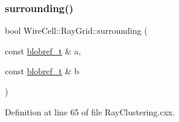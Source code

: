 \subsubsection{\texorpdfstring{surrounding()}{surrounding()}}
{\footnotesize\ttfamily bool Wire\+Cell\+::\+Ray\+Grid\+::surrounding (\begin{DoxyParamCaption}\item[{const \hyperlink{namespace_wire_cell_1_1_ray_grid_abed76699c704f53d6c4ce912da18050b}{blobref\+\_\+t} \&}]{a,  }\item[{const \hyperlink{namespace_wire_cell_1_1_ray_grid_abed76699c704f53d6c4ce912da18050b}{blobref\+\_\+t} \&}]{b }\end{DoxyParamCaption})}



Definition at line 65 of file Ray\+Clustering.\+cxx.

